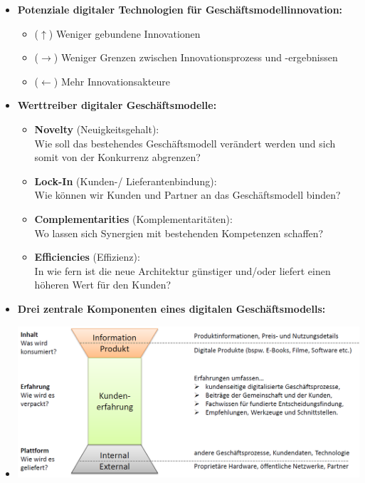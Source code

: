 \documentclass[12pt,a4paper]{article}
\begin{document}
\begin{itemize}
   \newpage
   \item \textbf{Potenziale digitaler Technologien für Geschäftsmodellinnovation:}
         \begin{itemize}
            \item ($\uparrow$) Weniger gebundene Innovationen
            \item ($\rightarrow$) Weniger Grenzen zwischen Innovationsprozess und -ergebnissen
            \item ($\leftarrow$) Mehr Innovationsakteure
         \end{itemize}

   \item \textbf{Werttreiber digitaler Geschäftsmodelle:}
         \begin{itemize}
            \item \textbf{Novelty} (Neuigkeitsgehalt):\\
                  Wie soll das bestehendes Geschäftsmodell verändert werden und sich somit von der Konkurrenz abgrenzen?
            \item \textbf{Lock-In} (Kunden-/ Lieferantenbindung):\\
                  Wie können wir Kunden und Partner an das Geschäftsmodell binden?
            \item \textbf{Complementarities} (Komplementaritäten):\\
                  Wo lassen sich Synergien mit bestehenden Kompetenzen schaffen?
            \item \textbf{Efficiencies} (Effizienz):\\
                  In wie fern ist die neue Architektur günstiger und/oder liefert einen höheren Wert für den Kunden?
         \end{itemize}
   
   \item \textbf{Drei zentrale Komponenten eines digitalen Geschäftsmodells:}
   \item[] \includegraphics[scale=0.47]{DreiKomponenten.png}
\end{itemize}
\end{document}
